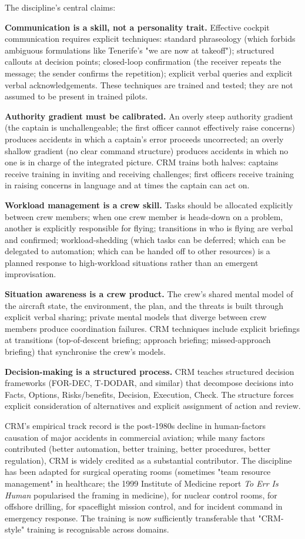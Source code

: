 The discipline's central claims:

\textbf{Communication is a skill, not a personality trait.} Effective cockpit communication requires explicit techniques: standard phraseology (which forbids ambiguous formulations like Tenerife's "we are now at takeoff"); structured callouts at decision points; closed-loop confirmation (the receiver repeats the message; the sender confirms the repetition); explicit verbal queries and explicit verbal acknowledgements. These techniques are trained and tested; they are not assumed to be present in trained pilots.

\textbf{Authority gradient must be calibrated.} An overly steep authority gradient (the captain is unchallengeable; the first officer cannot effectively raise concerns) produces accidents in which a captain's error proceeds uncorrected; an overly shallow gradient (no clear command structure) produces accidents in which no one is in charge of the integrated picture. CRM trains both halves: captains receive training in inviting and receiving challenges; first officers receive training in raising concerns in language and at times the captain can act on.

\textbf{Workload management is a crew skill.} Tasks should be allocated explicitly between crew members; when one crew member is heads-down on a problem, another is explicitly responsible for flying; transitions in who is flying are verbal and confirmed; workload-shedding (which tasks can be deferred; which can be delegated to automation; which can be handed off to other resources) is a planned response to high-workload situations rather than an emergent improvisation.

\textbf{Situation awareness is a crew product.} The crew's shared mental model of the aircraft state, the environment, the plan, and the threats is built through explicit verbal sharing; private mental models that diverge between crew members produce coordination failures. CRM techniques include explicit briefings at transitions (top-of-descent briefing; approach briefing; missed-approach briefing) that synchronise the crew's models.

\textbf{Decision-making is a structured process.} CRM teaches structured decision frameworks (FOR-DEC, T-DODAR, and similar) that decompose decisions into Facts, Options, Risks/benefits, Decision, Execution, Check. The structure forces explicit consideration of alternatives and explicit assignment of action and review.

CRM's empirical track record is the post-1980s decline in human-factors causation of major accidents in commercial aviation; while many factors contributed (better automation, better training, better procedures, better regulation), CRM is widely credited as a substantial contributor. The discipline has been adapted for surgical operating rooms (sometimes "team resource management" in healthcare; the 1999 Institute of Medicine report \emph{To Err Is Human} popularised the framing in medicine), for nuclear control rooms, for offshore drilling, for spaceflight mission control, and for incident command in emergency response. The training is now sufficiently transferable that "CRM-style" training is recognisable across domains.

